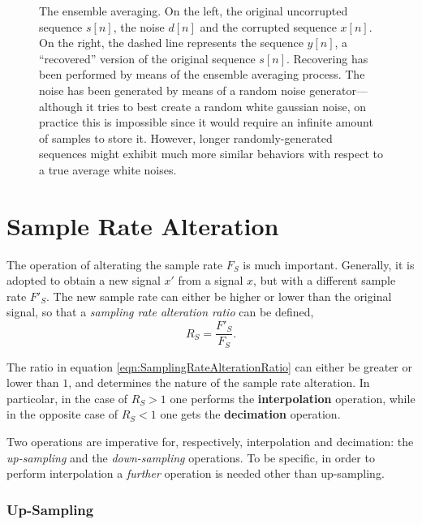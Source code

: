 \documentclass[\documentfontsize, twocolumn]{\classname}
\begin{document}
\begin{figure*}[ht]
\begin{center}
\scalebox{0.32}{


}\caption{The ensemble averaging. On the left, the original uncorrupted sequence $s[n]$, the noise $d[n]$ and the corrupted sequence $x[n]$. On the right, the dashed line represents the sequence $y[n]$, a ``recovered'' version of the original sequence $s[n]$. Recovering has been performed by means of the ensemble averaging process. The noise has been generated by means of a random noise generator---although it tries to best create a random white gaussian noise, on practice this is impossible since it would require an infinite amount of samples to store it. However, longer randomly-generated sequences might exhibit much more similar behaviors with respect to a true average white noises.}\label{oct:ensembleAveraging}
\end{center}
\end{figure*}

\section{Sample Rate Alteration}

The operation of alterating the sample rate $F_S$ is much important. Generally, it is adopted to obtain a new signal $x'$ from a signal $x$, but with a different sample rate $F'_S$. The new sample rate can either be high\-er or lower than the original signal, so that a \emph{sampling rate alteration ratio} can be defined,
\begin{equation}\label{eqn:SamplingRateAlterationRatio}
	R_S = \frac{F'_S}{F_S}.
\end{equation}

The ratio in equation \ref{eqn:SamplingRateAlterationRatio} can either be greater or lower than $1$, and determines the nature of the sample rate alteration. In particolar, in the case of $R_S > 1$ one performs the \textbf{interpolation} operation, while in the opposite case of $R_S < 1$ one gets the \textbf{decimation} operation.

Two operations are imperative for, respectively, interpolation and decimation: the \emph{up-sampling} and the \emph{down-sam\-pling} operations. To be specific, in order to perform interpolation a \emph{further} operation is needed other than up-sampling.

\subsubsection{Up-Sampling}
\end{document}
